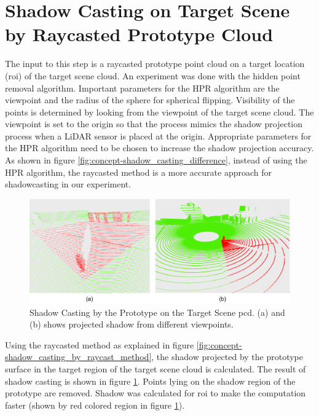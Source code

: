\section{Shadow Casting on Target Scene by Raycasted Prototype Cloud}
The input to this step is a raycasted prototype point cloud on a target location (\acrshort{roi}) of the target scene cloud. An experiment was done with the hidden point removal algorithm. Important parameters for the HPR algorithm are the viewpoint and the radius of the sphere for spherical flipping. Visibility of the points is determined by looking from the viewpoint of the target scene cloud. The viewpoint is set to the origin so that the process mimics the shadow projection process when a LiDAR sensor is placed at the origin. Appropriate parameters for the HPR algorithm need to be chosen to increase the shadow projection accuracy. As shown in figure \ref{fig:concept-shadow_casting_difference}, instead of using the HPR algorithm, the raycasted method is a more accurate approach for shadowcasting in our experiment. 

\begin{figure}[htbp]
    \centering
    \includegraphics[width=1\linewidth]{97_graphics/results/shadow_casting_by_prototype.pdf}
    \caption{Shadow Casting by the Prototype on the Target Scene \acrfull{pcd}. (a) and (b) shows projected shadow from different viewpoints.}
    \label{fig:result-shadow_casting_by_prototype}
\end{figure}

Using the raycasted method as explained in figure \ref{fig:concept-shadow_casting_by_raycast_method}, the shadow projected by the prototype surface in the target region of the target scene cloud is calculated. The result of shadow casting is shown in figure \ref{fig:result-shadow_casting_by_prototype}. Points lying on the shadow region of the prototype are removed. Shadow was calculated for \acrshort{roi} to make the computation faster (shown by red colored region in figure \ref{fig:result-shadow_casting_by_prototype}).